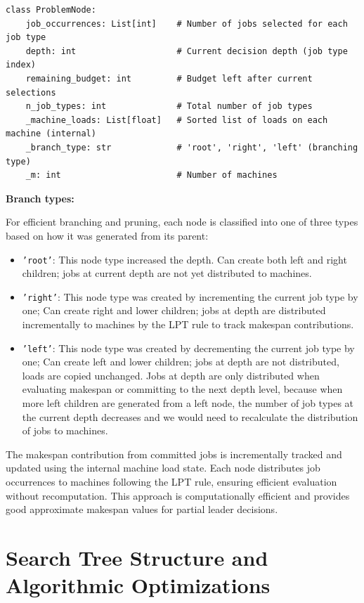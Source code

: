 \begin{lstlisting}
class ProblemNode:
    job_occurrences: List[int]    # Number of jobs selected for each job type
    depth: int                    # Current decision depth (job type index)
    remaining_budget: int         # Budget left after current selections
    n_job_types: int              # Total number of job types
    _machine_loads: List[float]   # Sorted list of loads on each machine (internal)
    _branch_type: str             # 'root', 'right', 'left' (branching type)
    _m: int                       # Number of machines
\end{lstlisting}




\textbf{Branch types:}

For efficient branching and pruning, each node is classified into one of three types based on how it was generated from its parent:

\begin{itemize}
    \item \texttt{'root'}: This node type increased the depth. Can create both left and right children; jobs at current depth are not yet distributed to machines.
    \item \texttt{'right'}: This node type was created by incrementing the current job type by one; Can create right and lower children; jobs at depth are distributed incrementally to machines by the LPT rule to track makespan contributions.
    \item \texttt{'left'}: This node type was created by decrementing the current job type by one; Can create left and lower children; jobs at depth are not distributed, loads are copied unchanged. 
    Jobs at depth are only distributed when evaluating makespan or committing to the next depth level, because when more left children are generated from a left node, the number of job types at the current depth decreases and we would need to recalculate the distribution of jobs to machines.
\end{itemize}


The makespan contribution from committed jobs is incrementally tracked and updated using the internal machine load state. Each node distributes job occurrences to machines following the LPT rule, ensuring efficient evaluation without recomputation. This approach is computationally efficient and provides good approximate makespan values for partial leader decisions.

\section{Search Tree Structure and Algorithmic Optimizations}

